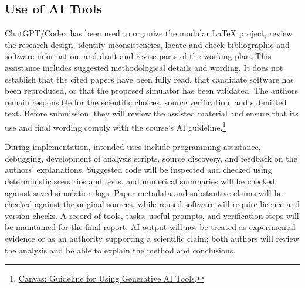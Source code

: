 \subsection{Use of AI Tools}
ChatGPT/Codex has been used to organize the modular LaTeX project, review the research design, identify inconsistencies, locate and check bibliographic and software information, and draft and revise parts of the working plan. This assistance includes suggested methodological details and wording. It does not establish that the cited papers have been fully read, that candidate software has been reproduced, or that the proposed simulator has been validated. The authors remain responsible for the scientific choices, source verification, and submitted text. Before submission, they will review the assisted material and ensure that its use and final wording comply with the course's AI guideline.\footnote{\href{https://canvas.kth.se/courses/63857/pages/guideline-for-using-generative-ai-tools}{Canvas: Guideline for Using Generative AI Tools}.}

During implementation, intended uses include programming assistance, debugging, development of analysis scripts, source discovery, and feedback on the authors' explanations. Suggested code will be inspected and checked using deterministic scenarios and tests, and numerical summaries will be checked against saved simulation logs. Paper metadata and substantive claims will be checked against the original sources, while reused software will require licence and version checks. A record of tools, tasks, useful prompts, and verification steps will be maintained for the final report. AI output will not be treated as experimental evidence or as an authority supporting a scientific claim; both authors will review the analysis and be able to explain the method and conclusions.
